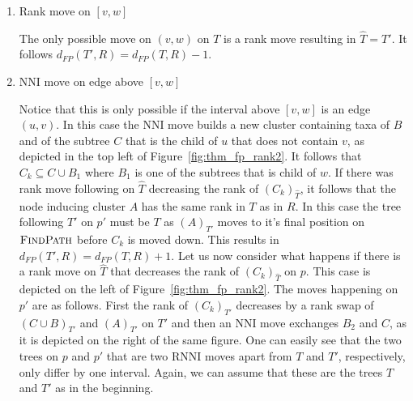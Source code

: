 \documentclass{amsart}
\newcommand{\rnni}{\mathrm{RNNI}}
\newcommand{\findpath}{\textsc{FindPath}}
\newcommand{\nni}{\mathrm{NNI}}
\begin{document}
\begin{enumerate}
    \item Rank move on $[v,w]$

    The only possible move on $(v,w)$ on $T$ is a rank move resulting in $\hat T = T'$.
    It follows $d_{FP}(T',R) = d_{FP}(T,R) - 1$.

    \item $\nni$ move on edge above $[v,w]$

    Notice that this is only possible if the interval above $[v,w]$ is an edge $(u,v)$.
    In this case the $\nni$ move builds a new cluster containing taxa of $B$ and of the subtree $C$ that is the child of $u$ that does not contain $v$, as depicted in the top left of Figure~\ref{fig:thm_fp_rank2}.
    It follows that $C_k \subseteq C \cup B_1$ where $B_1$ is one of the subtrees that is child of $w$.
    If there was rank move following on $\hat T$ decreasing the rank of $(C_k)_{\hat T}$, it follows that the node inducing cluster $A$ has the same rank in $T$ as in $R$.
    In this case the tree following $T'$ on $p'$ must be $T$ as $(A)_{T'}$ moves to it's final position on $\findpath$ before $C_k$ is moved down.
    This results in $d_{FP}(T',R) = d_{FP}(T,R) + 1$.
    Let us now consider what happens if there is a rank move on $\hat T$ that decreases the rank of $(C_k)_{\hat T}$ on $p$.
    This case is depicted on the left of Figure~\ref{fig:thm_fp_rank2}.
    The moves happening on $p'$ are as follows.
    First the rank of $(C_k)_{T'}$ decreases by a rank swap of $(C \cup B)_{T'}$ and $(A)_{T'}$ on $T'$ and then an $\nni$ move exchanges $B_2$ and $C$, as it is depicted on the right of the same figure.
    One can easily see that the two trees on $p$ and $p'$ that are two $\rnni$ moves apart from $T$ and $T'$, respectively, only differ by one interval.
    Again, we can assume that these are the trees $T$ and $T'$ as in the beginning.


\end{enumerate}
\end{document}

